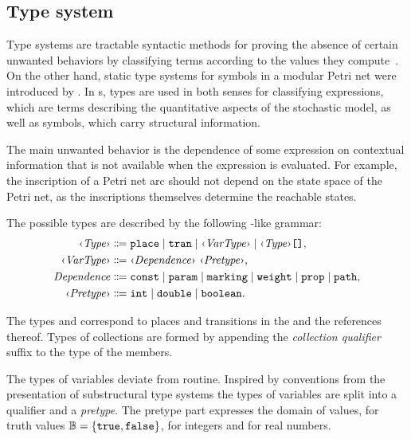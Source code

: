 \subsection{Type system}
\label{ssec:rgspn:typesystem}

Type systems are tractable syntactic methods for proving the absence of certain unwanted behaviors by classifying terms according to the values they compute~\citep[Chapter~1]{Pierce02tapl}. On the other hand, static type systems for symbols in a modular Petri net were introduced by \citet{Kindler07modular}. In s, types are used in both senses for classifying expressions, which are terms describing the quantitative aspects of the stochastic model, as well as symbols, which carry structural information.

The main unwanted behavior is the dependence of some expression on contextual information that is not available when the expression is evaluated. For example, the inscription of a Petri net arc should not depend on the state space of the Petri net, as the inscriptions themselves determine the reachable states.

The possible types are described by the following -like grammar:
\begin{equation}
  \begin{aligned}
    \ebnfVar{Type} &\ebnfEq \lit{place} \mid \lit{tran} \mid \ebnfVar{VarType} \mid \bagtype{\ebnfVar{Type}} \text, \\
    \ebnfVar{VarType} &\ebnfEq \vartype{\ebnfVar{Dependence}}{\ebnfVar{Pretype}} \text,\\
    \rel{Dependence} &\ebnfEq \lit{const} \mid \lit{param} \mid \lit{marking} \mid \lit{weight} \mid \lit{prop} \mid \lit{path} \text, \\
    \ebnfVar{Pretype} &\ebnfEq \lit{int} \mid \lit{double} \mid \lit{boolean} \text.
  \end{aligned} \label{eq:rgspn:type-ebnf}
\end{equation}

The types  and  correspond to places and transitions in the  and the references thereof. Types of collections are formed by appending the \emph{collection qualifier} suffix \lit{[]} to the type of the members.

The types of variables deviate from routine. Inspired by conventions from the presentation of substructural type systems  the types of variables are split into a qualifier and a \emph{pretype}. The pretype part expresses the domain of values,  for truth values \(\mathbb{B} = \{\texttt{\upshape true}, \texttt{\upshape false}\}\),  for integers and  for real numbers.

